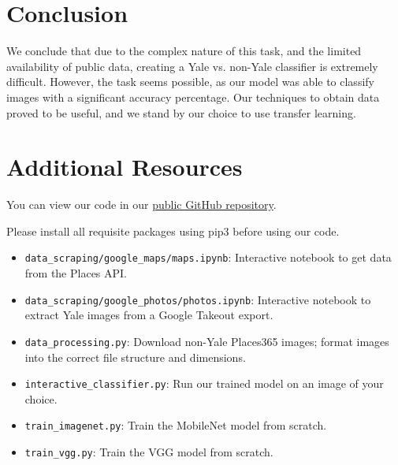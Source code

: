 \documentclass[letterpaper]{article} %
\begin{document}
\section{Conclusion}
We conclude that due to the complex nature of this task, and the limited availability of public data, creating a Yale vs. non-Yale classifier is extremely difficult. However, the task seems possible, as our model was able to classify images with a significant accuracy percentage. Our techniques to obtain data proved to be useful, and we stand by our choice to use transfer learning.

\section{Additional Resources}
You can view our code in our \href{https://github.com/EricYale/EENG439-Final-Project}{public GitHub repository}.

Please install all requisite packages using pip3 before using our code.

\begin{itemize}
    \item \texttt{data\_scraping/google\_maps/maps.ipynb}: Interactive notebook to get data from the Places API.
    \item \texttt{data\_scraping/google\_photos/photos.ipynb}: Interactive notebook to extract Yale images from a Google Takeout export.
    \item \texttt{data\_processing.py}: Download non-Yale Places365 images; format images into the correct file structure and dimensions.
    \item \texttt{interactive\_classifier.py}: Run our trained model on an image of your choice.
    \item \texttt{train\_imagenet.py}: Train the MobileNet model from scratch.
    \item \texttt{train\_vgg.py}: Train the VGG model from scratch.
\end{itemize}
\end{document}
